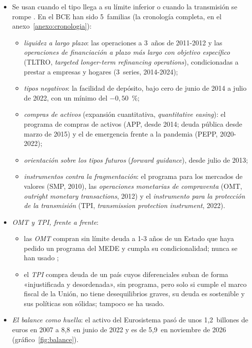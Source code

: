 \documentclass[11pt]{article}
\begin{document}
\begin{itemize}
\item Se usan cuando el tipo llega a su límite inferior o cuando la transmisión se rompe . En el BCE han sido 5~familias (la cronología completa, en el anexo~\ref{anexo:cronologia}):
  \begin{itemize}
  \item \emph{liquidez a largo plazo}: las operaciones a 3~años de 2011-2012 y las \emph{operaciones de financiación a plazo más largo con objetivo específico} (TLTRO, \emph{targeted longer-term refinancing operations}), condicionadas a prestar a empresas y hogares (3~series, 2014-2024)\nocite{BCE2026TLTRO,BCE2026OperacionesMercado};
  \item \emph{tipos negativos}: la facilidad de depósito, bajo cero de junio de 2014 a julio de 2022, con un mínimo del $-0{,}50$~\%\nocite{BCE2026TiposOficiales};
  \item \emph{compras de activos} (expansión cuantitativa, \emph{quantitative easing}): el programa de compras de activos (APP, desde 2014; deuda pública desde marzo de 2015) y el de emergencia frente a la pandemia (PEPP, 2020-2022)\nocite{BCE2026APP,BCE2026PEPP};
  \item \emph{orientación sobre los tipos futuros} (\emph{forward guidance}), desde julio de 2013\nocite{BCE2013Orientacion};
  \item \emph{instrumentos contra la fragmentación}: el programa para los mercados de valores (SMP, 2010), las \emph{operaciones monetarias de compraventa} (OMT, \emph{outright monetary transactions}, 2012) y el \emph{instrumento para la protección de la transmisión} (TPI, \emph{transmission protection instrument}, 2022)\nocite{BCE2012OMT,BCE2022TPI}.
  \end{itemize}
\item \emph{OMT y TPI, frente a frente}:
  \begin{itemize}
  \item las \emph{OMT} compran sin límite deuda a 1-3 años de un Estado que haya pedido un programa del MEDE y cumpla su condicionalidad; nunca se han usado ;
  \item el \emph{TPI} compra deuda de un país cuyos diferenciales suban de forma «injustificada y desordenada», sin programa, pero solo si cumple el marco fiscal de la Unión, no tiene desequilibrios graves, su deuda es sostenible y sus políticas son sólidas; tampoco se ha usado.
  \end{itemize}
\item \emph{El balance como huella}: el activo del Eurosistema pasó de unos 1,2~billones de euros en 2007 a 8,8~en junio de 2022 y es de 5,9~en noviembre de 2026\nocite{BCE2026ILM} (gráfico~\ref{fig:balance}).
\end{itemize}
\end{document}
